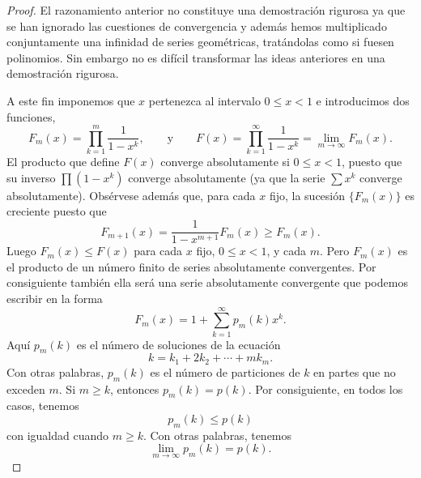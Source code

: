 \documentclass[12pt,a4paper]{book}
\begin{document}
\begin{proof}
        El razonamiento anterior no constituye una demostración rigurosa ya que se han ignorado
        las cuestiones de convergencia y además hemos multiplicado conjuntamente una infinidad
        de series geométricas, tratándolas como si fuesen polinomios. Sin embargo no es difícil
        transformar las ideas anteriores en una demostración rigurosa.

        A este fin imponemos que $x$ pertenezca al intervalo $0\leq x<1$ e introducimos dos
        funciones,
        \begin{equation*}
            F_{m}(x)=\prod_{k=1}^{m}\frac{1}{1-x^{k}},\qquad\text{y}\qquad F(x)=\prod_{k=1}^{\infty}\frac{1}{1-x^{k}}=\lim_{m\to\infty}F_{m}(x).
        \end{equation*}
        El producto que define $F(x)$ converge absolutamente si $0\leq x<1$, puesto que su
        inverso $\prod(1-x^{k})$ converge absolutamente (ya que la serie $\sum x^{k}$ converge
        absolutamente). Obsérvese además que, para cada $x$ fijo, la sucesión $\{F_{m}(x)\}$ es
        creciente puesto que
        \begin{equation*}
            F_{m+1}(x)=\frac{1}{1-x^{m+1}}F_{m}(x)\geq F_{m}(x).
        \end{equation*}
        Luego $F_{m}(x)\leq F(x)$ para cada $x$ fijo, $0\leq x<1$, y cada $m$. Pero $F_{m}(x)$ es
        el producto de un número finito de series absolutamente convergentes. Por consiguiente
        también ella será una serie absolutamente convergente que podemos escribir en la forma
        \begin{equation*}
            F_{m}(x)=1+\sum_{k=1}^{\infty}p_{m}(k)x^{k}.
        \end{equation*}
        Aquí $p_{m}(k)$ es el número de soluciones de la ecuación
        \begin{equation*}
            k=k_{1}+2k_{2}+\cdots+mk_{m}.
        \end{equation*}
        Con otras palabras, $p_{m}(k)$ es el número de particiones de $k$ en partes que no exceden
        $m$. Si $m\geq k$, entonces $p_{m}(k)=p(k)$. Por consiguiente, en todos los casos,
        tenemos
        \begin{equation*}
            p_{m}(k)\leq p(k)
        \end{equation*}
        con igualdad cuando $m\geq k$. Con otras palabras, tenemos
        \begin{equation*}
            \lim_{m\to\infty}p_{m}(k)=p(k).
        \end{equation*}

\end{proof}
\end{document}
